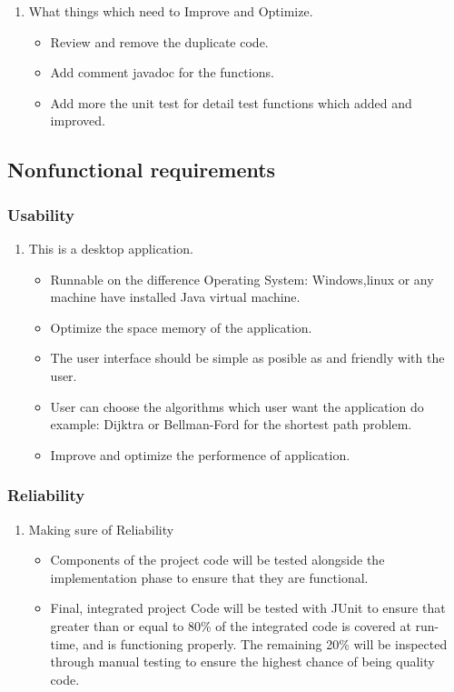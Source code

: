 \documentclass[a4paper,10pt]{article}
\begin{document}
\begin{enumerate}
\item What things which need to Improve and Optimize.
\begin{itemize}
\item Review and remove the duplicate code.
\item Add comment javadoc for the functions.
\item Add more the unit test for detail test functions which added and improved.
\end{itemize}
\end{enumerate}

\subsection{Nonfunctional requirements}
\subsubsection{Usability}
\begin{enumerate}
\item This is a desktop application.
\begin{itemize}
\item Runnable on the difference Operating System: Windows,linux or any machine have installed Java virtual machine.
\item Optimize the space memory of the application.
\item The user interface should be simple as posible as and friendly with the user.
\item User can choose the algorithms which user want the application do example: Dijktra or Bellman-Ford for the shortest path problem.
\item Improve and optimize the performence of application.

\end{itemize}
\end{enumerate}
\subsubsection{Reliability}

\begin{enumerate}
\item Making sure of Reliability
\begin{itemize}
\item Components of the project code will be tested alongside the implementation phase to ensure that they are functional. 
\item Final, integrated project Code will be tested with JUnit to ensure that greater than or equal to 80\% of the integrated code is covered at run-time, and is functioning properly. The remaining 20\% will be inspected through manual testing to ensure the highest chance of being quality code.


\end{itemize}
\end{enumerate}
\end{document}
